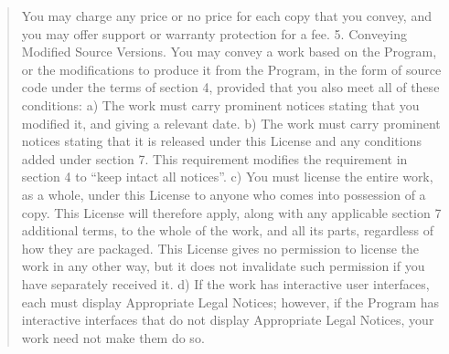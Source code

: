 \documentclass[letterpaper,10pt,english]{sphinxmanual}
\begin{document}
\begin{quote}
You may charge any price or no price for each copy that you convey, and you may offer support or warranty protection for a fee.
5. Conveying Modified Source Versions.
You may convey a work based on the Program, or the modifications to produce it from the Program, in the form of source code under the terms of section 4, provided that you also meet all of these conditions:
a) The work must carry prominent notices stating that you modified it, and giving a relevant date.
b) The work must carry prominent notices stating that it is released under this License and any conditions added under section 7. This requirement modifies the requirement in section 4 to “keep intact all notices”.
c) You must license the entire work, as a whole, under this License to anyone who comes into possession of a copy. This License will therefore apply, along with any applicable section 7 additional terms, to the whole of the work, and all its parts, regardless of how they are packaged. This License gives no permission to license the work in any other way, but it does not invalidate such permission if you have separately received it.
d) If the work has interactive user interfaces, each must display Appropriate Legal Notices; however, if the Program has interactive interfaces that do not display Appropriate Legal Notices, your work need not make them do so.


\end{quote}
\end{document}

